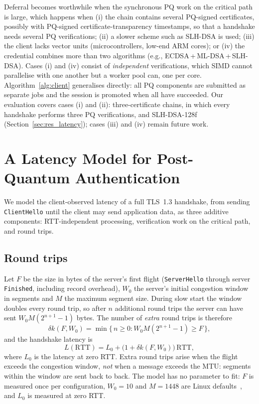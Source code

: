 \documentclass[preprint,10pt,3p]{elsarticle}
\begin{document}
Deferral becomes worthwhile when the synchronous PQ work on the critical
path is large, which happens when (i) the chain contains several
PQ-signed certificates, possibly with PQ-signed certificate-transparency
timestamps, so that a handshake needs several PQ verifications; (ii) a
slower scheme such as SLH-DSA is used; (iii) the client lacks vector units
(microcontrollers, low-end ARM cores); or (iv) the credential combines more
than two algorithms (e.g., ECDSA\,+\,ML-DSA\,+\,SLH-DSA).  Cases (i) and
(iv) consist of \emph{independent} verifications, which SIMD cannot
parallelise with one another but a worker pool can, one per core.
Algorithm~\ref{alg:client} generalises directly: all PQ components are
submitted as separate jobs and the session is promoted when all have
succeeded.  Our evaluation covers cases (i) and (ii): three-certificate
chains, in which every handshake performs three PQ verifications, and
SLH-DSA-128f (Section~\ref{sec:res_latency}); cases (iii) and (iv) remain
future work.

\section{A Latency Model for Post-Quantum Authentication}
\label{sec:analytical}

We model the client-observed latency of a full TLS~1.3 handshake, from
sending \texttt{ClientHello} until the client may send application data,
as three additive components: RTT-independent processing, verification
work on the critical path, and round trips.

\subsection{Round trips}

Let $F$ be the size in bytes of the server's first flight
(\texttt{ServerHello} through server \texttt{Finished}, including record
overhead), $W_0$ the server's initial congestion window in segments and
$M$ the maximum segment size.  During slow start the window doubles every
round trip, so after $n$ additional round trips the server can have sent
$W_0 M (2^{n+1}-1)$ bytes.  The number of \emph{extra} round trips is
therefore
\begin{equation}
  \delta k(F, W_0) = \min\{\, n \ge 0 : W_0 M (2^{n+1}-1) \ge F \,\},
  \label{eq:dk}
\end{equation}
and the handshake latency is
\begin{equation}
  L(\mathrm{RTT}) = L_0 + \bigl(1 + \delta k(F, W_0)\bigr)\,\mathrm{RTT},
  \label{eq:latency}
\end{equation}
where $L_0$ is the latency at zero RTT.  Extra round trips arise when the
flight exceeds the congestion window, \emph{not} when a message exceeds
the MTU: segments within the window are sent back to back.  The model has
no parameter to fit: $F$ is measured once per configuration, $W_0 = 10$
and $M = 1448$ are Linux defaults~\cite{RFC6928}, and $L_0$ is measured
at zero RTT.
\end{document}
